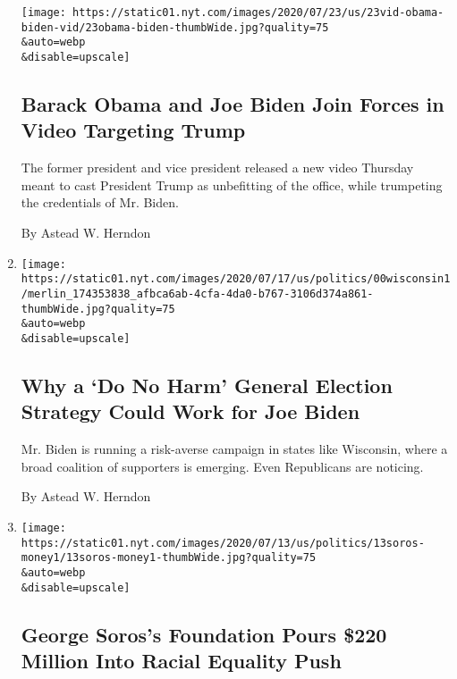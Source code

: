 \begin{enumerate}
  \texttt{[image: https://static01.nyt.com/images/2020/07/23/us/23vid-obama-biden-vid/23obama-biden-thumbWide.jpg?quality=75\\\&auto=webp\\\&disable=upscale]}

  \hypertarget{barack-obama-and-joe-biden-join-forces-in-video-targeting-trump}{%
  \subsection{Barack Obama and Joe Biden Join Forces in Video Targeting
  Trump}\label{barack-obama-and-joe-biden-join-forces-in-video-targeting-trump}}

  The former president and vice president released a new video Thursday
  meant to cast President Trump as unbefitting of the office, while
  trumpeting the credentials of Mr. Biden.

  By Astead W. Herndon
\item
  \href{/2020/07/19/us/politics/joe-biden-wisconsin-election.html}{}

  \texttt{[image: https://static01.nyt.com/images/2020/07/17/us/politics/00wisconsin1/merlin\_174353838\_afbca6ab-4cfa-4da0-b767-3106d374a861-thumbWide.jpg?quality=75\\\&auto=webp\\\&disable=upscale]}

  \hypertarget{why-a-do-no-harm-general-election-strategy-could-work-for-joe-biden}{%
  \subsection{Why a `Do No Harm' General Election Strategy Could Work
  for Joe
  Biden}\label{why-a-do-no-harm-general-election-strategy-could-work-for-joe-biden}}

  Mr. Biden is running a risk-averse campaign in states like Wisconsin,
  where a broad coalition of supporters is emerging. Even Republicans
  are noticing.

  By Astead W. Herndon
\item
  \href{/2020/07/13/us/politics/george-soros-racial-justice-organizations.html}{}

  \texttt{[image: https://static01.nyt.com/images/2020/07/13/us/politics/13soros-money1/13soros-money1-thumbWide.jpg?quality=75\\\&auto=webp\\\&disable=upscale]}

  \hypertarget{george-soross-foundation-pours-220-million-into-racial-equality-push}{%
  \subsection{George Soros's Foundation Pours \$220 Million Into Racial
  Equality
  Push}\label{george-soross-foundation-pours-220-million-into-racial-equality-push}}


\end{enumerate}
